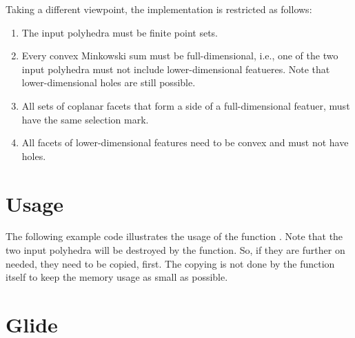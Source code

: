 Taking a different viewpoint, the implementation is restricted as
follows:
\begin{enumerate}
\item The input polyhedra must be finite point sets.
\item Every convex Minkowski sum must be full-dimensional, i.e., one 
of the two input polyhedra must not include lower-dimensional
featueres. Note that lower-dimensional holes are still possible.
\item All sets of coplanar facets that form a side of a full-dimensional
featuer, must have the same selection mark.
\item All facets of lower-dimensional features need to be convex and 
must not have holes.
\end{enumerate}

\section{Usage}

The following example code illustrates the usage of the function
. Note that the two input polyhedra will be
destroyed by the function. So, if they are further on needed, they
need to be copied, first. The copying is not done by the function
itself to keep the memory usage as small as possible.


\section{Glide}

